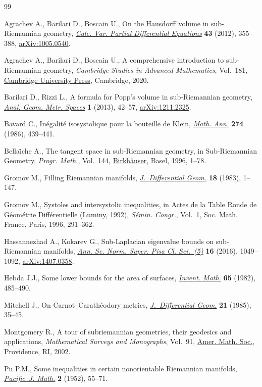 \begin{thebibliography}{99}
\footnotesize\itemsep=0pt

Agrachev A., Barilari D., Boscain U., On the {H}ausdorff volume in
 sub-{R}iemannian geometry, \href{https://doi.org/10.1007/s00526-011-0414-y}{\textit{Calc. Var. Partial Differential Equations}}
 \textbf{43} (2012), 355--388, \href{https://arxiv.org/abs/1005.0540}{arXiv:1005.0540}.

Agrachev A., Barilari D., Boscain U., A comprehensive introduction to
 sub-{R}iemannian geometry, \textit{Cambridge Studies in Advanced
 Mathematics}, Vol.~181, \href{https://doi.org/10.1017/9781108677325}{Cambridge University Press}, Cambridge, 2020.

Barilari D., Rizzi L., A formula for {P}opp's volume in sub-{R}iemannian
 geometry, \href{https://doi.org/10.2478/agms-2012-0004}{\textit{Anal. Geom. Metr. Spaces}} \textbf{1} (2013), 42--57,
 \href{https://arxiv.org/abs/1211.2325}{arXiv:1211.2325}.

Bavard C., In\'egalit\'e isosystolique pour la bouteille de {K}lein,
 \href{https://doi.org/10.1007/BF01457227}{\textit{Math. Ann.}} \textbf{274} (1986), 439--441.

Bella\"{\i}che A., The tangent space in sub-{R}iemannian geometry, in
 Sub-{R}iemannian Geometry, \textit{Progr. Math.}, Vol.~144, \href{https://doi.org/10.1007/978-3-0348-9210-0_1}{Birkh\"auser},
 Basel, 1996, 1--78.

Gromov M., Filling {R}iemannian manifolds, \href{https://doi.org/10.4310/jdg/1214509283}{\textit{J.~Differential Geom.}}
 \textbf{18} (1983), 1--147.

Gromov M., Systoles and intersystolic inequalities, in Actes de la {T}able
 {R}onde de {G}\'eom\'etrie {D}iff\'erentielle ({L}uminy, 1992),
 \textit{S\'emin. Congr.}, Vol.~1, Soc. Math. France, Paris, 1996, 291--362.

Hassannezhad A., Kokarev G., Sub-{L}aplacian eigenvalue bounds on
 sub-{R}iemannian manifolds, \href{https://doi.org/10.2422/2036-2145.201409_005}{\textit{Ann. Sc. Norm. Super. Pisa Cl. Sci.~(5)}}
 \textbf{16} (2016), 1049--1092, \href{https://arxiv.org/abs/1407.0358}{arXiv:1407.0358}.

Hebda J.J., Some lower bounds for the area of surfaces, \href{https://doi.org/10.1007/BF01396632}{\textit{Invent. Math.}}
 \textbf{65} (1982), 485--490.

Mitchell J., On {C}arnot--{C}arath\'eodory metrics, \href{https://doi.org/10.4310/jdg/1214439462}{\textit{J.~Differential
 Geom.}} \textbf{21} (1985), 35--45.

Montgomery R., A tour of subriemannian geometries, their geodesics and
 applications, \textit{Mathematical Surveys and Monographs}, Vol.~91, \href{https://doi.org/10.1090/surv/091}{Amer.
 Math. Soc.}, Providence, RI, 2002.

Pu P.M., Some inequalities in certain nonorientable {R}iemannian manifolds,
 \href{https://doi.org/10.2140/pjm.1952.2.55}{\textit{Pacific~J. Math.}} \textbf{2} (1952), 55--71.

\end{thebibliography}
